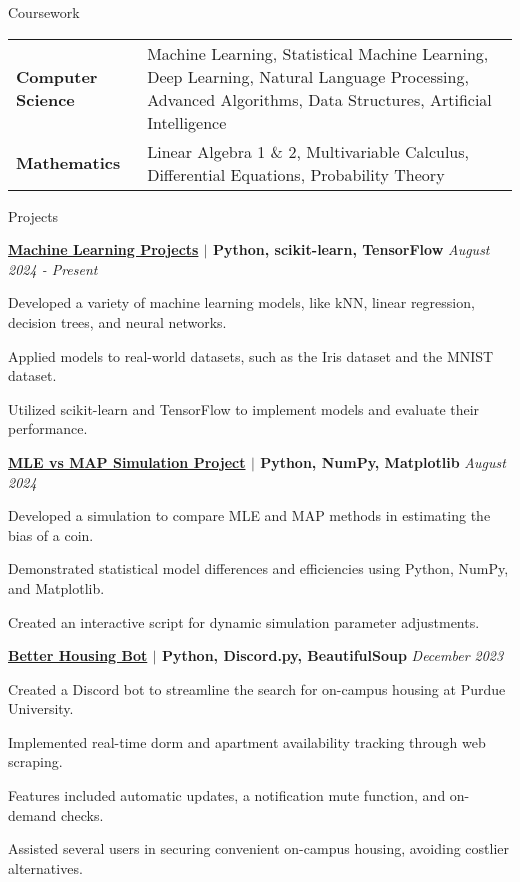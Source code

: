 \documentclass[
    11pt, %
]{resume} %
\begin{document}
\begin{rSection}{Coursework}
\vspace*{-0.3cm}
  \begin{tabular}{ @{} >{\bfseries}l p{14cm} }
    Computer Science & Machine Learning, Statistical Machine Learning, Deep Learning, Natural Language Processing, Advanced Algorithms, Data Structures, Artificial Intelligence \\
    Mathematics & Linear Algebra 1 \& 2, Multivariable Calculus, Differential Equations, Probability Theory \\
  \end{tabular}
\end{rSection}
\vspace*{-0.2cm}

\vspace*{-0.3cm}
\begin{rSection}{Projects}
\vspace*{-0.3cm}

    \begin{rSubsection}{}{}{\bf \href{}{Machine Learning Projects} $\mid$ Python, scikit-learn, TensorFlow }{\hfill \em August 2024 - Present}
        \item Developed a variety of machine learning models, like kNN, linear regression, decision trees, and neural networks.
        \item Applied models to real-world datasets, such as the Iris dataset and the MNIST dataset.
        \item Utilized scikit-learn and TensorFlow to implement models and evaluate their performance.
    \end{rSubsection}


\begin{rSubsection}{}{}{\bf \href{https://github.com/maxinimus/MLEvsMAP}{MLE vs MAP Simulation Project} $\mid$ Python, NumPy, Matplotlib }{\hfill \em August 2024}
    \item Developed a simulation to compare MLE and MAP methods in estimating the bias of a coin.
    \item Demonstrated statistical model differences and efficiencies using Python, NumPy, and Matplotlib.
    \item Created an interactive script for dynamic simulation parameter adjustments.
\end{rSubsection}

    \begin{rSubsection}{}{}{\bf \href{https://github.com/maxinimus/better-housing-bot}{Better Housing Bot} $\mid$ Python, Discord.py, BeautifulSoup }{\hfill \em December 2023}
        \item Created a Discord bot to streamline the search for on-campus housing at Purdue University.
        \item Implemented real-time dorm and apartment availability tracking through web scraping.
        \item Features included automatic updates, a notification mute function, and on-demand checks.
        \item Assisted several users in securing convenient on-campus housing, avoiding costlier alternatives.
    \end{rSubsection}


\end{rSection}
\end{document}

